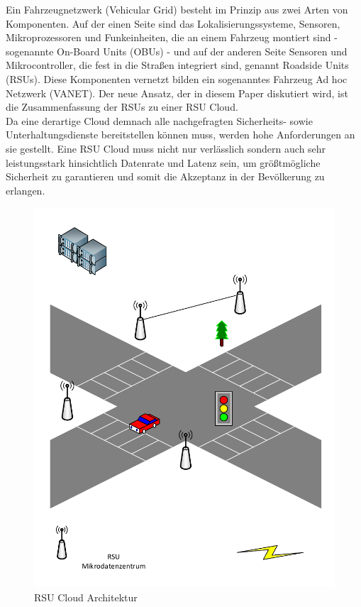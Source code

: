 \documentclass[conference]{IEEEtran}
\begin{document}
Ein Fahrzeugnetzwerk (Vehicular Grid) besteht im Prinzip aus zwei Arten von Komponenten. Auf der einen Seite sind das Lokalisierungssysteme, Sensoren, Mikroprozessoren und Funkeinheiten, die an einem Fahrzeug montiert sind - sogenannte On-Board Units (OBUs) - und auf der anderen Seite  Sensoren und Mikrocontroller, die fest in die Straßen integriert sind, genannt Roadside Units (RSUs). Diese Komponenten vernetzt bilden ein sogenanntes Fahrzeug Ad hoc Netzwerk (VANET). Der neue Ansatz, der in diesem Paper diskutiert wird, ist die Zusammenfassung der RSUs zu einer RSU Cloud.\\
Da eine derartige Cloud demnach alle nachgefragten Sicherheits- sowie Unterhaltungsdienste bereitstellen können muss, werden hohe Anforderungen an sie gestellt. Eine RSU Cloud muss nicht nur verlässlich sondern auch sehr leistungsstark hinsichtlich Datenrate und Latenz sein, um größtmögliche Sicherheit zu garantieren und somit die Akzeptanz in der Bevölkerung zu erlangen.\\

\begin{figure}[h!]
	\centering
	\includegraphics[scale=0.6]{strasse.pdf}
	\caption{RSU Cloud Architektur}
	\label{img:grafik-dummy}
\end{figure}
\end{document}
